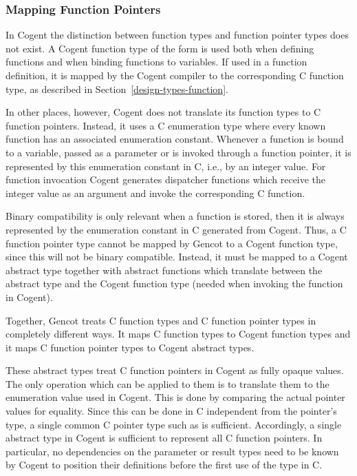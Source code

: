 \subsubsection{Mapping Function Pointers}

In Cogent the distinction between function types and function pointer types does not exist. 
A Cogent function type of the form  is used both when
defining functions and when binding functions to variables. If used in a function definition, it is mapped by
the Cogent compiler to the corresponding C function type, as described in Section~\ref{design-types-function}.

In other places, however, Cogent does not translate its function types to C function pointers. Instead, it uses 
a C enumeration type where every known function has an associated enumeration constant. Whenever a 
function is bound to a variable, passed as a parameter or is invoked through a function pointer, it is 
represented by this enumeration constant in C, i.e., by an integer value.
For function invocation Cogent generates dispatcher functions which receive the integer value as an argument
and invoke the corresponding C function. 

Binary compatibility is only relevant when a function is stored, then it is always represented by the enumeration
constant in C generated from Cogent. Thus, a C function pointer type cannot be mapped by Gencot to a Cogent function type,
since this will not be binary compatible. Instead, it must be mapped to a Cogent abstract type together with 
abstract functions which translate between the abstract type and the Cogent function type (needed when invoking 
the function in Cogent).

Together, Gencot treats C function types and C function pointer types in completely different ways. It maps
C function types to Cogent function types and it maps C function pointer types to Cogent abstract types.

These abstract types treat C function pointers in Cogent as fully opaque values. The only operation which can 
be applied to them is to translate them to the enumeration value used in Cogent. This is done by comparing the
actual pointer values for equality. Since this can be done in C independent from the pointer's type, a single 
common C pointer type such as  is sufficient. Accordingly, a single abstract type in Cogent is
sufficient to represent all C function pointers. In particular, no dependencies on the parameter or result types 
need to be known by Cogent to position their definitions before the first use of the type in C. 

